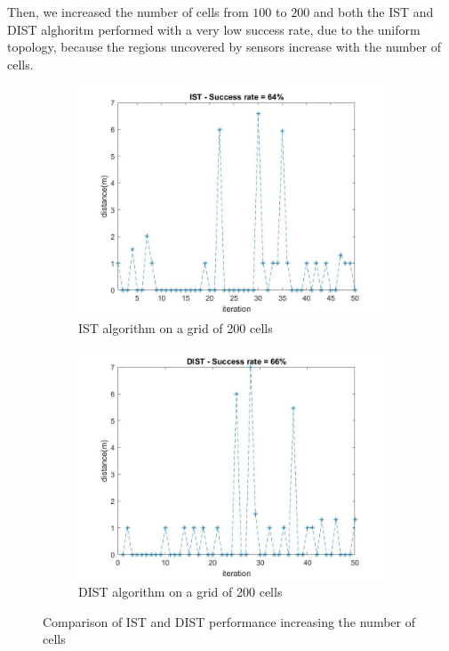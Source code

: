 Then, we increased the number of cells from $100$ to $200$ and both the IST and DIST alghoritm performed with a very low success rate, 
due to the uniform topology, because the regions uncovered by sensors increase with the number of cells.

\begin{figure}[H]
    \begin{subfigure}{0.45\textwidth}
        \centering
        \includegraphics[width=\textwidth]{img/ist_200_p.jpg}
        \caption{IST algorithm on a grid of 200 cells}
    \end{subfigure}
    \hfill
    \begin{subfigure}{0.45\textwidth}
        \centering
        \includegraphics[width=\textwidth]{img/dist_200_p.jpg}
        \caption{DIST algorithm on a grid of 200 cells}
    \end{subfigure}
    \caption{Comparison of IST and DIST performance increasing the number of cells}
\end{figure}

